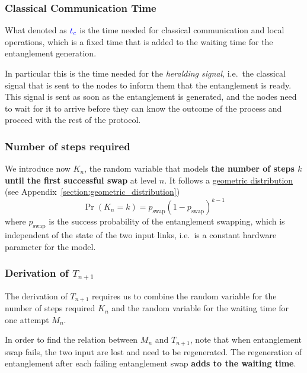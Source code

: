\documentclass{masterthesis}
\begin{document}

\subsubsection*{Classical Communication Time}

What denoted as $\textcolor{blue}{t_c}$ is the time needed for classical communication and local operations, which is a fixed time that is added to the waiting time for the entanglement generation.

In particular this is the time needed for the \textit{heralding signal}, i.e.\ the classical signal that is sent to the nodes to inform them that the entanglement is ready. This signal is sent as soon as the entanglement is generated, and the nodes need to wait for it to arrive before they can know the outcome of the process and proceed with the rest of the protocol.

\subsubsection*{Number of steps required}

We introduce now $K_n$, the random variable that models \textbf{the number of steps $k$ until the first successful swap} at level $n$. It follows a \hyperref[subsection:geometric_pdf]{geometric distribution} (see Appendix~\ref{section:geometric_distribution})
\begin{equation}\label{eq:pdf_swap_steps}
    \Pr(K_n = k) = p_\text{swap} {(1 - p_\text{swap})}^{k-1}
\end{equation}
where $p_\text{swap}$ is the success probability of the entanglement swapping, which is independent of the state of the two input links, i.e.\ is a constant hardware parameter for the model.

\subsubsection*{Derivation of $T_{n+1}$}
The derivation of $T_{n+1}$ requires us to combine the random variable for the number of steps required $K_n$ and the random variable for the waiting time for one attempt $M_n$.

In order to find the relation between $M_n$ and $T_{n+1}$, note that when entanglement swap fails, the two input are lost and need to be
regenerated. The regeneration of entanglement after each failing entanglement swap \textbf{adds to the waiting time}. 
\end{document}
